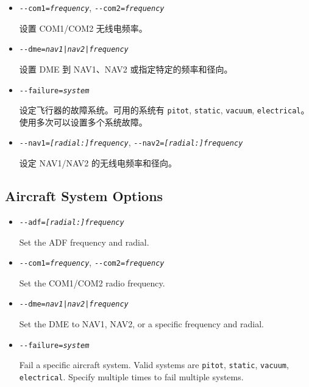 \begin{itemize}
{\begin{itemize}
\item{\texttt{-$ $-com1={\it frequency}}, \texttt{-$ $-com2={\it frequency}}}

 设置 COM1/COM2 无线电频率。

\item{\texttt{-$ $-dme={\it {nav1|nav2|frequency}}}}

 设置 DME 到 NAV1、NAV2 或指定特定的频率和径向。

\item{\texttt{-$ $-failure={\it system}}}

 设定飞行器的故障系统。可用的系统有  \texttt{pitot}, \texttt{static}, \texttt{vacuum}, \texttt{electrical}。使用多次可以设置多个系统故障。

\item{\texttt{-$ $-nav1={\it [radial:]frequency}}, \texttt{-$ $-nav2={\it [radial:]frequency}}}

 设定 NAV1/NAV2 的无线电频率和径向。

\end{itemize}
}
\fi
\iffalse
{
  \subsection{Aircraft System Options}
  \begin{itemize}
  \item{\texttt{-$ $-adf={\it [radial:]frequency}}}

  Set the ADF frequency and radial.

  \item{\texttt{-$ $-com1={\it frequency}}, \texttt{-$ $-com2={\it frequency}}}

  Set the COM1/COM2 radio frequency.

  \item{\texttt{-$ $-dme={\it {nav1|nav2|frequency}}}}

  Set the DME to NAV1, NAV2, or a specific frequency and radial.

  \item{\texttt{-$ $-failure={\it system}}}

  Fail a specific aircraft system. Valid systems are \texttt{pitot}, \texttt{static},
  \texttt{vacuum}, \texttt{electrical}. Specify multiple times to fail multiple systems.


\end{itemize}}
\end{itemize}
